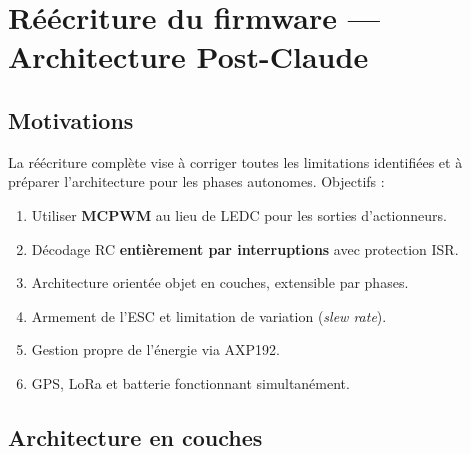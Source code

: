 \documentclass[12pt,a4paper]{article}
\begin{document}
\section{R\'e\'ecriture du firmware --- Architecture Post-Claude}

\subsection{Motivations}

La r\'e\'ecriture compl\`ete vise à corriger toutes les limitations identifi\'ees et
à pr\'eparer l'architecture pour les phases autonomes. Objectifs :

\begin{enumerate}
  \item Utiliser \textbf{MCPWM} au lieu de LEDC pour les sorties d'actionneurs.
  \item D\'ecodage RC \textbf{enti\`erement par interruptions} avec protection ISR.
  \item Architecture orient\'ee objet en couches, extensible par phases.
  \item Armement de l'ESC et limitation de variation (\emph{slew rate}).
  \item Gestion propre de l'\'energie via AXP192.
  \item GPS, LoRa et batterie fonctionnant simultan\'ement.
\end{enumerate}

\subsection{Architecture en couches}
\end{document}

